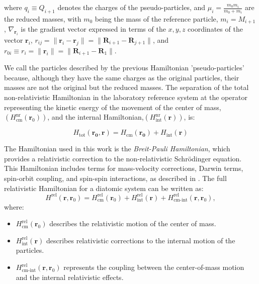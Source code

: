 \documentclass[%
 reprint,
 amsmath,amssymb,
 aps,
]{revtex4-2}
\begin{document}
where \( q_i \equiv Q_{i+1} \) denotes the charges of the pseudo-particles, and \( \mu_i = \frac{m_0 m_i}{m_0 + m_i} \) are the reduced masses, with \( m_0 \) being the mass of the reference particle, \( m_i = M_{i+1} \), \( \nabla_{\mathbf{r}_i} \) is the gradient vector expressed in terms of the \(x, y, z\) coordinates of the vector \( \mathbf{r}_i \), \( r_{ij} = \lVert \mathbf{r}_i - \mathbf{r}_j \rVert = \lVert \mathbf{R}_{i+1} - \mathbf{R}_{j+1} \rVert \), and \( r_{0i} \equiv r_i = \lVert \mathbf{r}_i \rVert = \lVert \mathbf{R}_{i+1} - \mathbf{R}_1 \rVert \).


We call the particles described by the previous Hamiltonian 'pseudo-particles' because, although they have the same charges as the original particles, their masses are not the original but the reduced masses. The separation of the total non-relativistic Hamiltonian in the laboratory reference system at the operator representing the kinetic energy of the movement of the center of mass,  $( H_{\text{cm}}^{ \text{nr}}( \mathbf{r}_0)  )$, and the internal Hamiltonian,$( H_{\text{int}}^{\text{nr}}( \mathbf{r})  )$, is:

\begin{equation}
    H_{\text{tot}}(\mathbf{r_0}, \mathbf{r}) = H_{\text{cm}}(\mathbf{r_0}) + H_{\text{int}}(\mathbf{r})
\end{equation}


The Hamiltonian used in this work is the \textit{Breit-Pauli Hamiltonian}, which provides a relativistic correction to the non-relativistic Schrödinger equation. This Hamiltonian includes terms for mass-velocity corrections, Darwin terms, spin-orbit coupling, and spin-spin interactions, as described in \cite{Breit1929,Pauli1958,Bethe1977}. The full relativistic Hamiltonian for a diatomic system can be written as:
\begin{equation}
H^{\text{rel}}(\mathbf{r}, \mathbf{r}_0) = H^{\text{rel}}_{\text{cm}}(\mathbf{r}_0) + H^{\text{rel}}_{\text{int}}(\mathbf{r}) + H^{\text{rel}}_{\text{cm-int}}(\mathbf{r}, \mathbf{r}_0),
\end{equation}
where:
\begin{itemize}
    \item \( H^{\text{rel}}_{\text{cm}}(\mathbf{r}_0) \) describes the relativistic motion of the center of mass.
    \item \( H^{\text{rel}}_{\text{int}}(\mathbf{r}) \) describes relativistic corrections to the internal motion of the particles.
    \item \( H^{\text{rel}}_{\text{cm-int}}(\mathbf{r}, \mathbf{r}_0) \) represents the coupling between the center-of-mass motion and the internal relativistic effects.
\end{itemize}
\end{document}
